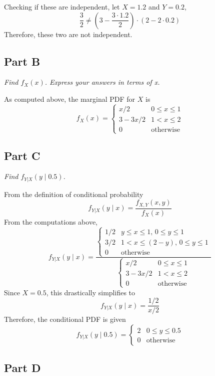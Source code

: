 \documentclass{article}
\begin{document}
Checking if these are independent, let $X = 1.2$ and $Y = 0.2$,
$$ \frac{3}{2} \neq \left(3 - \frac{3 \cdot 1.2}{2}\right) \cdot \left(2 - 2
\cdot 0.2 \right) $$
Therefore, these two are not independent.

\subsection*{Part B}

\textit{Find $ f_X(x) $. Express your answers in terms of x.}

\bigbreak

As computed above, the marginal PDF for $X$ is
$$ f_X(x) = \begin{cases}
    x / 2 & 0 \leq x \leq 1 \\
    3 - 3x / 2 & 1 < x \leq 2 \\
    0 & \mathrm{otherwise}
\end{cases} $$

\subsection*{Part C}

\textit{Find $ f_{Y|X}(y \mid 0.5) $.}

\bigbreak

From the definition of conditional probability
$$ f_{Y|X}(y \mid x) = \frac{f_{X,Y}(x,y)}{f_X(x)} $$
From the computations above,
$$ f_{Y|X}(y \mid x) = \frac{\begin{cases}
    1/2 & y \leq x \leq 1,\, 0 \leq y \leq 1 \\
    3/2 & 1 < x \leq (2 - y),\, 0 \leq y \leq 1 \\
    0 & \mathrm{otherwise}
\end{cases}}{\begin{cases}
    x / 2 & 0 \leq x \leq 1 \\
    3 - 3x / 2 & 1 < x \leq 2 \\
    0 & \mathrm{otherwise}
\end{cases}} $$
Since $X = 0.5$, this drastically simplifies to
$$ f_{Y|X}(y \mid x) = \frac{1/2}{x/2} $$
Therefore, the conditional PDF is given
$$ f_{Y|X}(y \mid 0.5) = \begin{cases}
    2 & 0 \leq y \leq 0.5 \\
    0 & \mathrm{otherwise}
\end{cases} $$

\subsection*{Part D}
\end{document}
